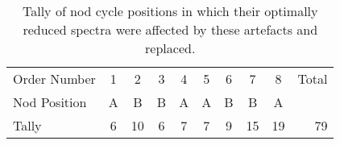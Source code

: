 \begin{table}
    \centering
    \caption{Tally of nod cycle positions in which their optimally reduced spectra were affected by these artefacts and replaced.}
    \begin{tabular}{lccccccccr}
        \toprule
        Order Number & 1 & 2 & 3 & 4 & 5 & 6 & 7 & 8 &Total\\
        Nod Position & A & B & B & A & A & B & B & A & \\
        \midrule
        Tally & 6 & 10 & 6 & 7 & 7 & 9 & 15 & 19 & 79\\
        \bottomrule
    \end{tabular}\label{tab:nod_artefact_tally}
\end{table}